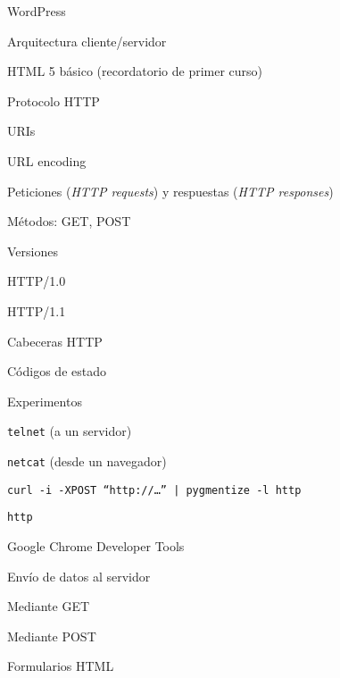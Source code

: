 \begin{longenum}
\begin{longenum}
\begin{longenum}
\begin{longenum}
\begin{longenum}
                    \item WordPress
                \end{longenum}
            \end{longenum}
        \end{longenum}
        \item Arquitectura cliente/servidor
        \item HTML 5 básico (recordatorio de primer curso)
        \item Protocolo HTTP
        \begin{longenum}
            \item URIs
            \begin{longenum}
                \item URL encoding
            \end{longenum}
            \item Peticiones (\textit{HTTP requests}) y respuestas (\textit{HTTP responses})
            \item Métodos: GET, POST
            \item Versiones
            \begin{longenum}
                \item HTTP/1.0
                \item HTTP/1.1
            \end{longenum}
            \item Cabeceras HTTP
            \item Códigos de estado
            \item Experimentos
            \begin{longenum}
                \item \texttt{telnet} (a un servidor)
                \item \texttt{netcat} (desde un navegador)
                \item \texttt{curl -i -XPOST “http://…” | pygmentize -l http}
                \item \texttt{http}
                \item Google Chrome Developer Tools
            \end{longenum}
            \item Envío de datos al servidor
            \begin{longenum}
                \item Mediante GET
                \item Mediante POST
                \item Formularios HTML

\end{longenum}
\end{longenum}
\end{longenum}
\end{longenum}
